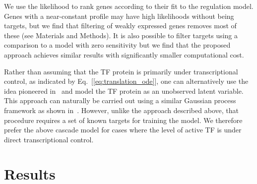 \documentclass{pnastwo}
\begin{document}
\begin{article}
We use the likelihood to rank genes according to their fit to the
regulation model. Genes with a
near-constant profile may have high likelihoods without being targets,
but we find that filtering of weakly expressed genes removes most of
these (see Materials and Methods). It is also possible to filter
targets using a comparison to a model with
zero sensitivity but we find that the proposed approach achieves
similar results with significantly smaller computational cost.

Rather than assuming that the TF protein is primarily under
transcriptional control, as indicated by
Eq.~[\ref{eq:translation_ode}], one can alternatively use the idea pioneered
in~\cite{Barenco2006a,Khanin2006} and model the TF protein as an unobserved
latent variable. This approach can naturally be carried out using a
similar Gaussian process framework as shown in~\cite{Gao2008}.
However, 
unlike the approach described above,
that procedure requires a set of known
targets for training the model. %
We therefore
prefer the above cascade model for cases where the level of active
TF is under direct transcriptional control. 

\section{Results}


\end{article}
\end{document}
